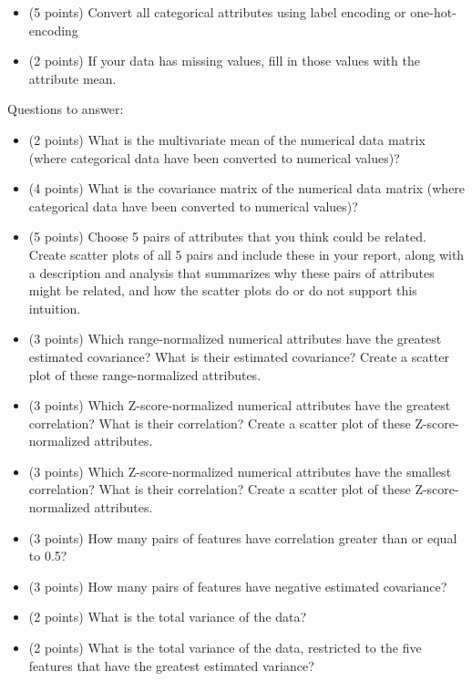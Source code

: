 \documentclass[11pt]{article}
\begin{document}
\begin{itemize}

    \item (5 points) Convert all categorical attributes using label encoding or
    one-hot-encoding

    \item (2 points) If your data has missing values, fill in those values with
    the attribute mean.

\end{itemize}

\noindent Questions to answer:
\begin{itemize}

    \item (2 points) What is the multivariate mean of the numerical data matrix
    (where categorical data have been converted to numerical values)?

    \item (4 points) What is the covariance matrix of the numerical data matrix
    (where categorical data have been converted to numerical values)?

    \item (5 points) Choose 5 pairs of attributes that you think could be
    related. Create scatter plots of all 5 pairs and include these in your
    report, along with a description and analysis that summarizes why these
    pairs of attributes might be related, and how the scatter plots do or do not
    support this intuition.

    \item (3 points) Which range-normalized numerical attributes have the
    greatest estimated covariance? What is their estimated covariance? Create a
    scatter plot of these range-normalized attributes.

    \item (3 points) Which Z-score-normalized numerical attributes have the
    greatest correlation? What is their correlation? Create a scatter plot of
    these Z-score-normalized attributes.

    \item (3 points) Which Z-score-normalized numerical attributes have the
    smallest correlation? What is their correlation? Create a scatter plot of
    these Z-score-normalized attributes.

    \item (3 points) How many pairs of features have correlation greater than or
    equal to 0.5?

    \item (3 points) How many pairs of features have negative estimated
    covariance?

    \item (2 points) What is the total variance of the data?

    \item (2 points) What is the total variance of the data, restricted to the
    five features that have the greatest estimated variance?

\end{itemize}
\end{document}
